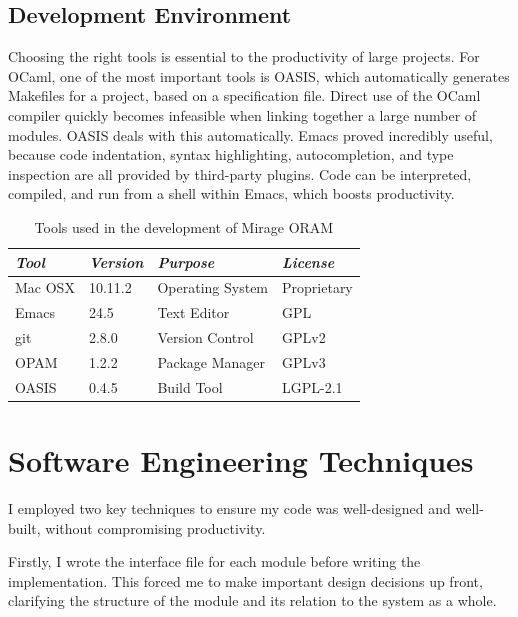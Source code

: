 \documentclass[12pt,a4paper,twoside,openright]{report}
\begin{document}
\subsection{Development Environment}

Choosing the right tools is essential to the productivity of large projects. For OCaml, one of the most important tools is OASIS, which automatically generates Makefiles for a project, based on a specification file. Direct use of the OCaml compiler quickly becomes infeasible when linking together a large number of modules. OASIS deals with this automatically.
Emacs proved incredibly useful, because code indentation, syntax highlighting, autocompletion, and type inspection are all provided by third-party plugins. Code can be interpreted, compiled, and run from a shell within Emacs, which boosts productivity.

\begin{table}[t]
    \centering
    \begin{tabular}{|l|l|l|l|}
      \hline
      \textit{Tool} & \textit{Version} & \textit{Purpose} & \textit{License} \\
      \hline \hline
      Mac OSX & 10.11.2 & Operating System & Proprietary \\
      \hline
      Emacs & 24.5 & Text Editor & GPL \\
      \hline
      git & 2.8.0 & Version Control & GPLv2 \\ 
      \hline
      OPAM & 1.2.2 & Package Manager & GPLv3 \\
      \hline
      OASIS & 0.4.5 & Build Tool & LGPL-2.1 \\
      \hline
    \end{tabular}
    \caption{Tools used in the development of Mirage ORAM}
    \label{tab:devtools}
\end{table}

\section{Software Engineering Techniques}

I employed two key techniques to ensure my code was well-designed and well-built, without compromising productivity.

Firstly, I wrote the interface file for each module before writing the implementation. This forced me to make important design decisions up front, clarifying the structure of the module and its relation to the system as a whole.
\end{document}
